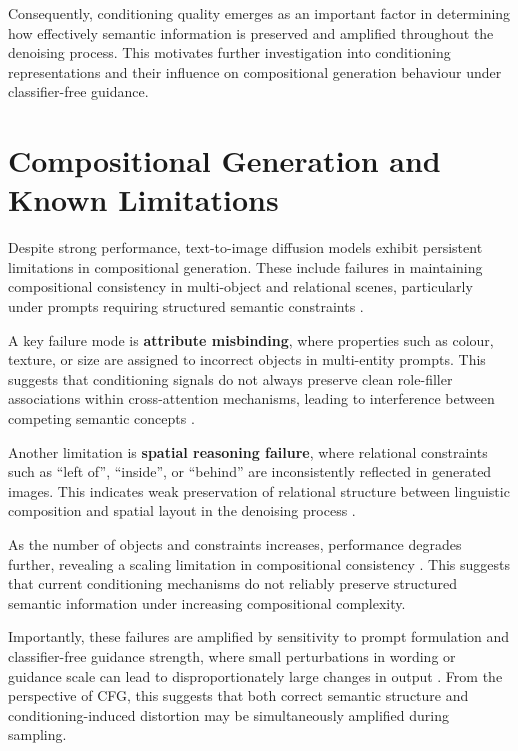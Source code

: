 \documentclass[a4paper,twoside,12pt]{report}
\begin{document}
Consequently, conditioning quality emerges as an important factor in determining how effectively semantic information is preserved and amplified throughout the denoising process. This motivates further investigation into conditioning representations and their influence on compositional generation behaviour under classifier-free guidance.
\section{Compositional Generation and Known Limitations}

Despite strong performance, text-to-image diffusion models exhibit persistent limitations in compositional generation. These include failures in maintaining compositional consistency in multi-object and relational scenes, particularly under prompts requiring structured semantic constraints \citep{liu2022composable, huang2023t2icompbench, mehrabi2023ambiguities}.

A key failure mode is \textbf{attribute misbinding}, where properties such as colour, texture, or size are assigned to incorrect objects in multi-entity prompts. This suggests that conditioning signals do not always preserve clean role-filler associations within cross-attention mechanisms, leading to interference between competing semantic concepts \citep{hertz2022prompt, liu2022composable}.

Another limitation is \textbf{spatial reasoning failure}, where relational constraints such as “left of”, “inside”, or “behind” are inconsistently reflected in generated images. This indicates weak preservation of relational structure between linguistic composition and spatial layout in the denoising process \citep{huang2023t2icompbench, saharia2022imagen}.

As the number of objects and constraints increases, performance degrades further, revealing a scaling limitation in compositional consistency \citep{liu2022composable, huang2023t2icompbench}. This suggests that current conditioning mechanisms do not reliably preserve structured semantic information under increasing compositional complexity.

Importantly, these failures are amplified by sensitivity to prompt formulation and classifier-free guidance strength, where small perturbations in wording or guidance scale can lead to disproportionately large changes in output \citep{ho2022cfg, saharia2022imagen}. From the perspective of CFG, this suggests that both correct semantic structure and conditioning-induced distortion may be simultaneously amplified during sampling.
\end{document}
